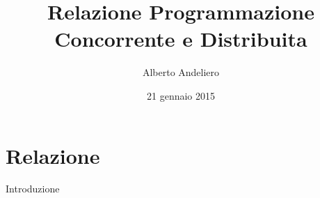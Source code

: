 \documentclass[12pt]{article}
\title{Relazione Programmazione Concorrente e Distribuita}
\author{Alberto Andeliero}
\date{21 gennaio 2015}
\begin{document}
\maketitle
\section{Relazione}
Introduzione
\end{document}
